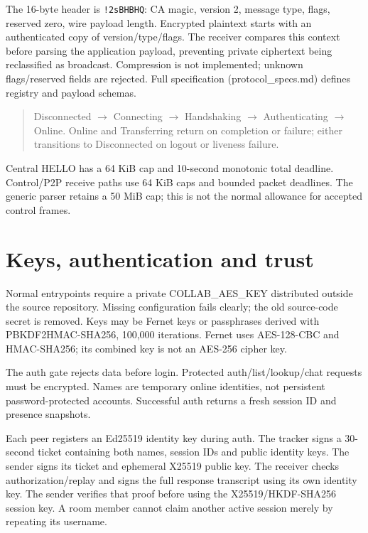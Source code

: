 \documentclass[11pt,a4paper]{article}
\begin{document}
The 16-byte header is \texttt{!2sBHBHQ}: CA magic, version 2, message type, flags, reserved zero, wire payload length. Encrypted plaintext starts with an authenticated copy of version/type/flags. The receiver compares this context before parsing the application payload, preventing private ciphertext being reclassified as broadcast. Compression is not implemented; unknown flags/reserved fields are rejected. Full specification (protocol\_specs.md) defines registry and payload schemas.

\begin{quote}Disconnected $\to$ Connecting $\to$ Handshaking $\to$ Authenticating $\to$ Online. Online and Transferring return on completion or failure; either transitions to Disconnected on logout or liveness failure.\end{quote}

Central HELLO has a 64 KiB cap and 10-second monotonic total deadline. Control/P2P receive paths use 64 KiB caps and bounded packet deadlines. The generic parser retains a 50 MiB cap; this is not the normal allowance for accepted control frames.

\section{Keys, authentication and trust}

Normal entrypoints require a private COLLAB\_AES\_KEY distributed outside the source repository. Missing configuration fails clearly; the old source-code secret is removed. Keys may be Fernet keys or passphrases derived with PBKDF2HMAC-SHA256, 100,000 iterations. Fernet uses AES-128-CBC and HMAC-SHA256; its combined key is not an AES-256 cipher key.

The auth gate rejects data before login. Protected auth/list/lookup/chat requests must be encrypted. Names are temporary online identities, not persistent password-protected accounts. Successful auth returns a fresh session ID and presence snapshots.

Each peer registers an Ed25519 identity key during auth. The tracker signs a 30-second ticket containing both names, session IDs and public identity keys. The sender signs its ticket and ephemeral X25519 public key. The receiver checks authorization/replay and signs the full response transcript using its own identity key. The sender verifies that proof before using the X25519/HKDF-SHA256 session key. A room member cannot claim another active session merely by repeating its username.
\end{document}
